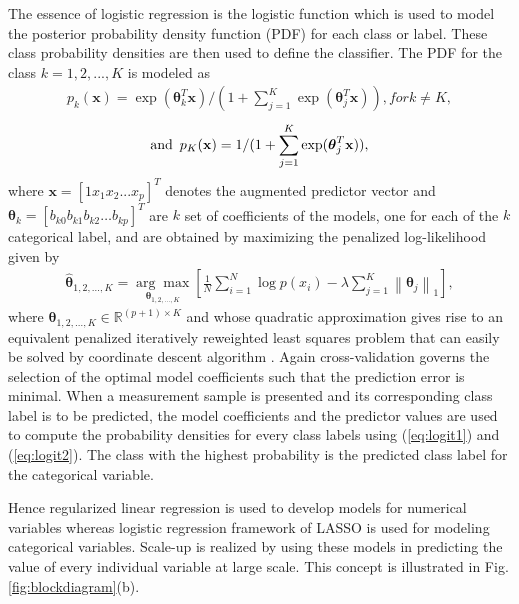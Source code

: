 \documentclass{article}
\begin{document}
The essence of logistic regression is the logistic function which is used to model the posterior probability density function (PDF) for each class or label. These class probability densities are then used to define the classifier. The PDF for the class $k = 1, 2, ..., K$ is modeled as
\vspace{-2mm}                 
\begin{align}\label{eq:logit1}
	p_k(\mathbf{x}) = \exp(\boldsymbol{\theta}_k^T \mathbf{x})/(1 + \sum_{j=1}^{K} \exp(\boldsymbol{\theta}_j^T \mathbf{x}) ),for k\neq K,
\end{align}
\vspace{-7mm}
\begin{align}\label{eq:logit2}
	\textrm{and} \enskip p_K(\mathbf{x})=1/(1+ \sum_{j=1}^{K} \exp(\boldsymbol{\theta}_j^T \mathbf{x})),
\end{align} 
where $\mathbf{x} = [1 x_1 x_2 ... x_p]^T$ denotes the augmented predictor vector and $\boldsymbol{\theta}_k = [b_{k0} b_{k1} b_{k2} \ldots b_{kp}]^T$ are $k$ set of coefficients of the models, one for each of the $k$ categorical label, and are obtained by maximizing the penalized log-likelihood given by
\begin{align}\label{eq:thetalogit}
	\hat{\boldsymbol{\theta}}_{1,2, \ldots ,K} = \underset{\boldsymbol{\theta}_{1,2, \ldots ,K}}{\arg\max} [\frac{1}{N} \sum_{i=1}^{N} \log p(x_i) - \lambda \sum_{j=1}^{K} \left\|\boldsymbol{\theta}_j\right\|_1],
\end{align}
where $\boldsymbol{\theta}_{1,2,\ldots,K} \in \mathbb{R}^{(p+1)\times K}$ and whose quadratic approximation gives rise to an equivalent penalized iteratively reweighted least squares problem that can easily be solved by coordinate descent algorithm \cite{ScaleUp_MLSP:friedman10}. Again cross-validation governs the selection of the optimal model coefficients such that the prediction error is minimal. When a measurement sample is presented and its corresponding class label is to be predicted, the model coefficients and the predictor values are used to compute the probability densities for every class labels using (\ref{eq:logit1}) and (\ref{eq:logit2}). The class with the highest probability is the predicted class label for the categorical variable.

Hence regularized linear regression is used to develop models for numerical variables whereas logistic regression framework of LASSO is used for modeling categorical variables. Scale-up is realized by using these models in predicting the value of every individual variable at large scale. This concept is illustrated in Fig. \ref{fig:blockdiagram}(b).
\end{document}
